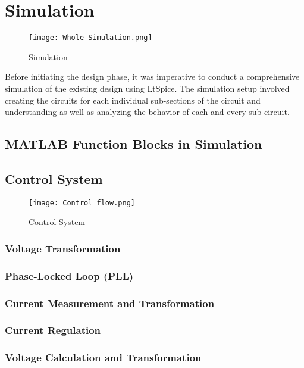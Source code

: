 \section{Simulation}
\begin{figure}[h]
    \centering
    \texttt{[image: Whole Simulation.png]}
    \caption{Simulation}
    \label{fig:Simulation}
\end{figure}
\noindent
Before initiating the design phase, it was imperative to conduct a
comprehensive simulation of the existing design using LtSpice. The simulation
setup involved creating the circuits for each individual sub-sections of the
circuit and understanding as well as analyzing the behavior of each and every
sub-circuit.

\subsection{MATLAB Function Blocks in Simulation}

\subsection{Control System}
\begin{figure}[h]
    \centering
    \texttt{[image: Control flow.png]}
    \caption{Control System}
    \label{fig:Control System}
\end{figure}
\subsubsection{Voltage Transformation}


\subsubsection{Phase-Locked Loop (PLL)}


\subsubsection{Current Measurement and Transformation}


\subsubsection{Current Regulation}


\subsubsection{Voltage Calculation and Transformation}


